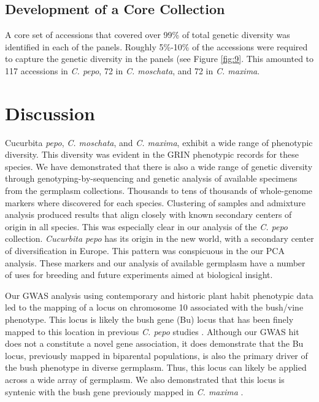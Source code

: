 \documentclass[utf8]{FrontiersinHarvard} %
\begin{document}
\subsection{Development of a Core Collection}
A core set of accessions that covered over 99\% of total genetic diversity was identified in each of the panels. Roughly 5\%-10\% of the accessions were required to capture the genetic diversity in the panels (see Figure \ref{fig:9}. This amounted to 117 accessions in \textit{C. pepo}, 72 in \textit{C. moschata}, and 72 in \textit{C. maxima}.

\section{Discussion}
Cucurbita \textit{pepo}, \textit{C. moschata}, and \textit{C. maxima}, exhibit a wide range of phenotypic diversity. This diversity was evident in the GRIN phenotypic records for these species. We have demonstrated that there is also a wide range of genetic diversity through genotyping-by-sequencing and genetic analysis of available specimens from the germplasm collections. Thousands to tens of thousands of whole-genome markers where discovered for each species. Clustering of samples and admixture analysis produced results that align closely with known secondary centers of origin in all species. This was especially clear in our analysis of the \textit{C. pepo} collection. \textit{Cucurbita pepo} has its origin in the new world, with a secondary center of diversification in Europe. This pattern was conspicuous in the our PCA analysis. These markers and our analysis of available germplasm have a number of uses for breeding and future experiments aimed at biological insight.

Our GWAS analysis using contemporary and historic plant habit phenotypic data led to the mapping of a locus on chromosome 10 associated with the bush/vine phenotype. This locus is likely the bush gene (Bu) locus that has been finely mapped to this location in previous \textit{C. pepo} studies \citep{Xiang2018, Ding2021}. Although our GWAS hit does not a constitute a novel gene association, it does demonstrate that the Bu locus, previously mapped in biparental populations, is also the primary driver of the bush phenotype in diverse germplasm. Thus, this locus can likely be applied across a wide array of germplasm. We also demonstrated that this locus is syntenic with the bush gene previously mapped in \textit{C. maxima} \citep{Zhang2015}. 
\end{document}
